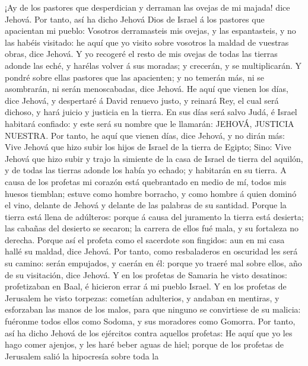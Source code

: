  ¡Ay de los pastores que desperdician y derraman las
ovejas de mi majada! dice Jehová.  Por tanto, así ha dicho
Jehová Dios de Israel á los pastores que apacientan mi pueblo: Vosotros
derramasteis mis ovejas, y las espantasteis, y no las habéis visitado:
he aquí que yo visito sobre vosotros la maldad de vuestras obras, dice
Jehová.  Y yo recogeré el resto de mis ovejas de todas las
tierras adonde las eché, y harélas volver á sus moradas; y crecerán, y
se multiplicarán.  Y pondré sobre ellas pastores que las
apacienten; y no temerán más, ni se asombrarán, ni serán menoscabadas,
dice Jehová.  He aquí que vienen los días, dice Jehová, y
despertaré á David renuevo justo, y reinará Rey, el cual será dichoso, y
hará juicio y justicia en la tierra.  En sus días será
salvo Judá, é Israel habitará confiado: y este será su nombre que le
llamarán: JEHOVÁ, JUSTICIA NUESTRA.  Por tanto, he aquí
que vienen días, dice Jehová, y no dirán más: Vive Jehová que hizo subir
los hijos de Israel de la tierra de Egipto;  Sino: Vive
Jehová que hizo subir y trajo la simiente de la casa de Israel de tierra
del aquilón, y de todas las tierras adonde los había yo echado; y
habitarán en su tierra.  A causa de los profetas mi
corazón está quebrantado en medio de mí, todos mis huesos tiemblan;
estuve como hombre borracho, y como hombre á quien dominó el vino,
delante de Jehová y delante de las palabras de su santidad.
 Porque la tierra está llena de adúlteros: porque á causa
del juramento la tierra está desierta; las cabañas del desierto se
secaron; la carrera de ellos fué mala, y su fortaleza no derecha.
 Porque así el profeta como el sacerdote son fingidos:
aun en mi casa hallé su maldad, dice Jehová.  Por tanto,
como resbaladeros en oscuridad les será su camino: serán empujados, y
caerán en él: porque yo traeré mal sobre ellos, año de su visitación,
dice Jehová.  Y en los profetas de Samaria he visto
desatinos: profetizaban en Baal, é hicieron errar á mi pueblo Israel.
 Y en los profetas de Jerusalem he visto torpezas:
cometían adulterios, y andaban en mentiras, y esforzaban las manos de
los malos, para que ninguno se convirtiese de su malicia: fuéronme todos
ellos como Sodoma, y sus moradores como Gomorra.  Por
tanto, así ha dicho Jehová de los ejércitos contra aquellos profetas: He
aquí que yo les hago comer ajenjos, y les haré beber aguas de hiel;
porque de los profetas de Jerusalem salió la hipocresía sobre toda la
